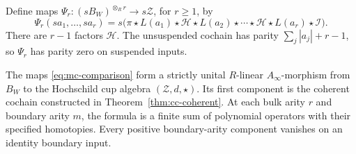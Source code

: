 Define maps \(\Psi_r:(sB_W)^{\otimes_R r}\to s\mathcal Z\),
for \(r\geq1\), by
\begin{equation}
 \Psi_r(sa_1,\ldots,sa_r)
   =s\bigl(\pi\star L(a_1)\star\mathcal H\star L(a_2)
           \star\cdots\star\mathcal H\star L(a_r)
           \star\mathcal I\bigr).
 \label{eq:mc-comparison}
\end{equation}
There are \(r-1\) factors \(\mathcal H\). The unsuspended
cochain has parity \(\sum_j|a_j|+r-1\), so \(\Psi_r\) has
parity zero on suspended inputs.

\begin{theorem}
\label{thm:mc-products}
The maps \eqref{eq:mc-comparison} form a strictly unital
\(R\)-linear \(A_\infty\)-morphism from \(B_W\) to the
Hochschild cup algebra \((\mathcal Z,d,\star)\).
Its first component is the coherent cochain constructed in
Theorem~\ref{thm:cc-coherent}.
At each bulk arity \(r\) and boundary arity \(m\), the formula
is a finite sum of polynomial operators with their specified
homotopies.
Every positive boundary-arity component vanishes on an
identity boundary input.
\end{theorem}
